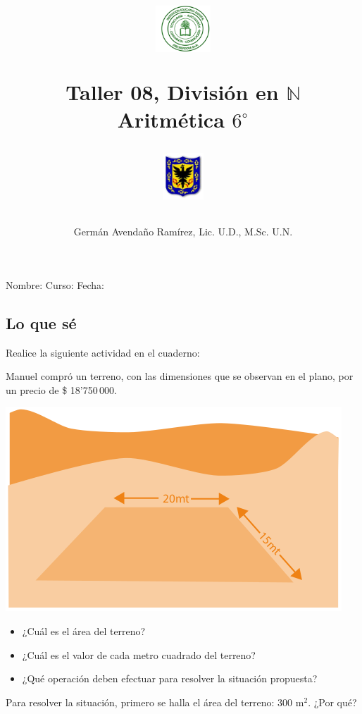 \documentclass[letterpaper,11pt,twoside]{article}
\author{Germ\'an Avenda\~no Ram\'irez, Lic. U.D., M.Sc. U.N.}
\title{\begin{minipage}{.2\textwidth}
\includegraphics[height=1.75cm]{Images/logo-colegio.png}\end{minipage}
\begin{minipage}{.55\textwidth}
\begin{center}
Taller 08, Divisi\'{o}n en $\mathbb{N}$\\
Aritmética $6^{\circ}$
\end{center}
\end{minipage}\hfill
\begin{minipage}{.2\textwidth}
\includegraphics[height=1.75cm]{Images/logo-sed.png} 
\end{minipage}}
\date{}
\begin{document}
\maketitle
Nombre: \hrulefill Curso: \underline{\hspace*{44pt}} Fecha: \underline{\hspace*{2.5cm}}
\begin{multicols}{2}
\section*{Lo que s\'{e}}
Realice la siguiente actividad en el cuaderno:

Manuel compró un terreno, con las dimensiones que se observan en el plano, por un precio de \$ 18'750\,000.
\begin{center}
\includegraphics[scale=.5]{Images/terreno.png} 
\end{center}
\begin{itemize}
\item ¿Cuál es el área del terreno?
\item ¿Cuál es el valor de cada metro cuadrado del terreno?
\item ¿Qué operación deben efectuar para resolver la situación propuesta?
\end{itemize}
Para resolver la situación, primero se halla el área del terreno: 300 m$^{2}$. ¿Por qué?


\end{multicols}
\end{document}
